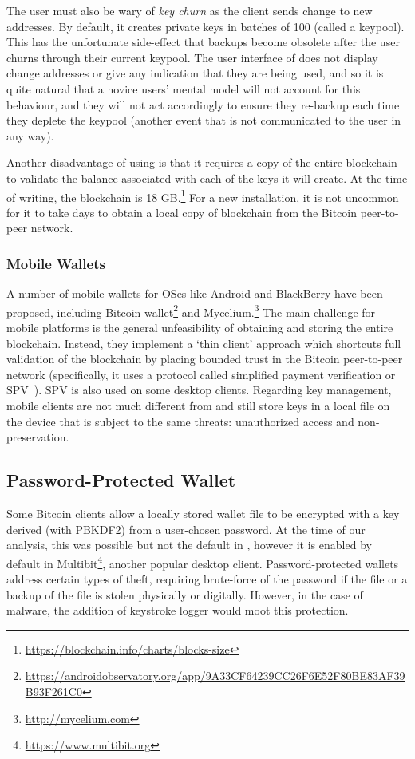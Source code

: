 The user must also be wary of \textit{key churn} as the \bitcoinclient client sends change to new addresses. By default, it creates private keys in batches of 100 (called a keypool). This has the unfortunate side-effect that backups become obsolete after the user churns through their current keypool. The user interface of \bitcoinclient does not display change addresses or give any indication that they are being used, and so it is quite natural that a novice users' mental model will not account for this behaviour, and they will not act accordingly to ensure they re-backup \walletfile each time they deplete the keypool (another event that is not communicated to the user in any way).

Another disadvantage of using \bitcoinclient is that it requires a copy of the entire blockchain to validate the balance associated with each of the keys it will create. At the time of writing, the blockchain is 18 GB.\footnote{\url{https://blockchain.info/charts/blocks-size}} For a new installation, it is not uncommon for it to take days to obtain a local copy of blockchain from the Bitcoin peer-to-peer network.

\subsubsection{Mobile Wallets}

A number of mobile wallets for OSes like Android and BlackBerry have been proposed, including Bitcoin-wallet\footnote{\url{https://androidobservatory.org/app/9A33CF64239CC26F6E52F80BE83AF39B93F261C0}} and Mycelium.\footnote{\url{http://mycelium.com}} The main challenge for mobile platforms is the general unfeasibility of obtaining and storing the entire blockchain. Instead, they implement a `thin client' approach which shortcuts full validation of the blockchain by placing bounded trust in the Bitcoin peer-to-peer network (specifically, it uses a protocol called simplified payment verification or SPV~\cite{}). SPV is also used on some desktop clients. Regarding key management, mobile clients are not much different from \bitcoinclient and still store keys in a local file on the device that is subject to the same threats: unauthorized access and non-preservation.

\subsection{Password-Protected Wallet}

Some Bitcoin clients allow a locally stored wallet file to be encrypted with a key derived (\eg with PBKDF2) from a user-chosen password. At the time of our analysis, this was possible but not the default in \bitcoinclient, however it is enabled by default in Multibit\footnote{\url{https://www.multibit.org}}, another popular desktop client. Password-protected wallets address certain types of theft, requiring brute-force of the password if the file or a backup of the file is stolen physically or digitally. However, in the case of malware, the addition of keystroke logger would moot this protection.

